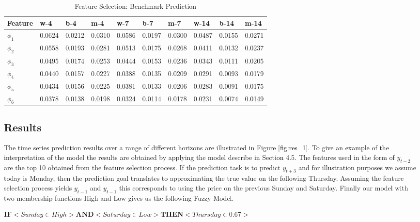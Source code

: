 \begin{table}[H]
\centering
\begin{tabular}{ |p{2cm}|p{1cm}|p{1cm}|p{1cm}|p{1cm}|p{1cm}|p{1cm}|p{1cm}|p{1cm}|p{1cm}| }
  \hline
 Feature & w-4 & b-4 & m-4 & w-7 & b-7 & m-7 & w-14 & b-14 & m-14   \\
 \hline

 $\phi_1$ & 0.0624   & 0.0212   & 0.0310 &  0.0586  & 0.0197 & 0.0300 & 0.0487 & 0.0155 & 0.0271\\
  \hline
  $\phi_2$ & 0.0558 & 0.0193 & 0.0281 & 0.0513 & 0.0175 & 0.0268 & 0.0411 & 0.0132 & 0.0237 \\
  \hline
  $\phi_3$ & 0.0495 & 0.0174 & 0.0253 & 0.0444 & 0.0153 & 0.0236 & 0.0343 & 0.0111 & 0.0205 \\
  \hline 
  $\phi_4$ & 0.0440 & 0.0157 & 0.0227 & 0.0388 & 0.0135 & 0.0209 & 0.0291 & 0.0093 & 0.0179 \\
  \hline 
  $\phi_5$ & 0.0434 & 0.0156 & 0.0225 & 0.0381 & 0.0133 & 0.0206 & 0.0283 & 0.0091 & 0.0175 \\
  \hline
  $\phi_6$ & 0.0378 & 0.0138 & 0.0198 & 0.0324 & 0.0114 & 0.0178 & 0.0231 & 0.0074 & 0.0149 \\
  \hline
 \end{tabular}
\caption{Feature Selection: Benchmark Prediction}
\label{tab:feat_mod1}
\end{table}



\subsection{Results}

The time series prediction results over a range of different horizons are illustrated in Figure \ref{fig:res_1}. To give an example of the interpretation of the model the results are obtained by applying the model describe in Section 4.5. The features used in the form of $y_{t-2}$ are the top 10 obtained from the feature selection process. If the prediction task is to predict $y_{t+3}$ and for illustration purposes we assume today is Monday, then the prediction goal translates to approximating the true value on the following Thursday. Assuming the feature selection process yields $y_{t-1}$  and $y_{t-1}$ this corresponds to using the price on the previous Sunday and Saturday. Finally our model with two membership functions High and Low gives us the following Fuzzy Model. \\

\centerline {$ \textbf{IF} <  Sunday \in High> \textbf{AND} < Saturday \in Low > \textbf{THEN} <  Thursday \in 0.67 > $} 

